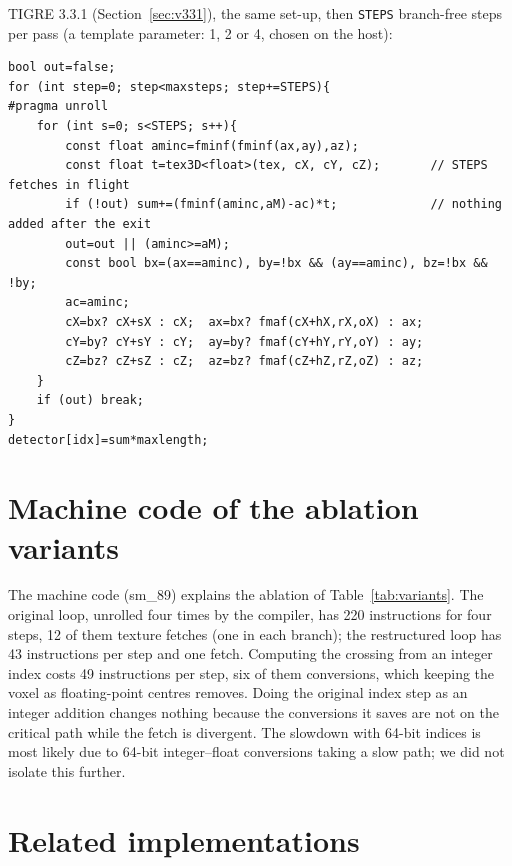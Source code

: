 \documentclass[11pt,a4paper]{article}
\theoremstyle{remark}
\begin{document}
TIGRE 3.3.1 (Section~\ref{sec:v331}), the same set-up, then \texttt{STEPS} branch-free steps per pass (a
template parameter: 1, 2 or 4, chosen on the host):
\begin{lstlisting}
bool out=false;
for (int step=0; step<maxsteps; step+=STEPS){
#pragma unroll
    for (int s=0; s<STEPS; s++){
        const float aminc=fminf(fminf(ax,ay),az);
        const float t=tex3D<float>(tex, cX, cY, cZ);       // STEPS fetches in flight
        if (!out) sum+=(fminf(aminc,aM)-ac)*t;             // nothing added after the exit
        out=out || (aminc>=aM);
        const bool bx=(ax==aminc), by=!bx && (ay==aminc), bz=!bx && !by;
        ac=aminc;
        cX=bx? cX+sX : cX;  ax=bx? fmaf(cX+hX,rX,oX) : ax;
        cY=by? cY+sY : cY;  ay=by? fmaf(cY+hY,rY,oY) : ay;
        cZ=bz? cZ+sZ : cZ;  az=bz? fmaf(cZ+hZ,rZ,oZ) : az;
    }
    if (out) break;
}
detector[idx]=sum*maxlength;
\end{lstlisting}


\section{Machine code of the ablation variants}
\label{app:sass}

The machine code (sm\_89) explains the ablation of Table~\ref{tab:variants}. The original loop, unrolled four
times by the compiler, has 220 instructions for four steps, 12 of them texture fetches (one in each branch);
the restructured loop has 43 instructions per step and one fetch. Computing the crossing from an integer index
costs 49 instructions per step, six of them conversions, which keeping the voxel as floating-point centres
removes. Doing the original index step as an integer addition changes nothing because the conversions it saves
are not on the critical path while the fetch is divergent. The slowdown with 64-bit indices is most likely due
to 64-bit integer--float conversions taking a slow path; we did not isolate this further.

\section{Related implementations}
\label{app:related}
\end{document}
